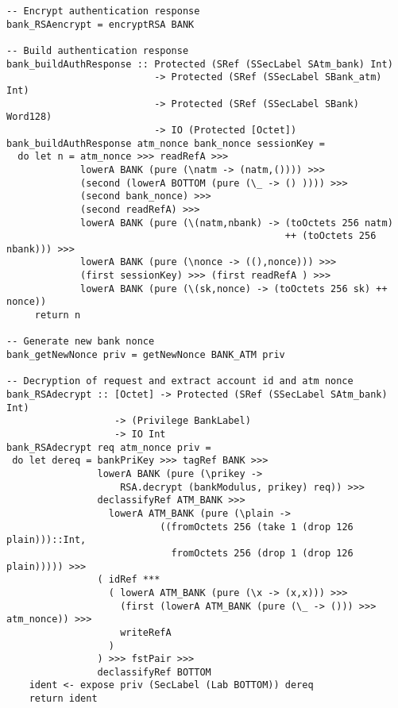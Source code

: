 \begin{Verbatim}[fontsize=\footnotesize,frame=lines,
                 framesep=5mm, label={[BankSystem.hs]BankSystem.hs}]
-- Encrypt authentication response
bank_RSAencrypt = encryptRSA BANK 

-- Build authentication response
bank_buildAuthResponse :: Protected (SRef (SSecLabel SAtm_bank) Int) 
                          -> Protected (SRef (SSecLabel SBank_atm) Int) 
                          -> Protected (SRef (SSecLabel SBank) Word128)
                          -> IO (Protected [Octet])
bank_buildAuthResponse atm_nonce bank_nonce sessionKey = 
  do let n = atm_nonce >>> readRefA >>> 
             lowerA BANK (pure (\natm -> (natm,()))) >>>
             (second (lowerA BOTTOM (pure (\_ -> () )))) >>>
             (second bank_nonce) >>> 
             (second readRefA) >>> 
	         lowerA BANK (pure (\(natm,nbank) -> (toOctets 256 natm) 
                                                 ++ (toOctets 256 nbank))) >>>
             lowerA BANK (pure (\nonce -> ((),nonce))) >>>
             (first sessionKey) >>> (first readRefA ) >>>
             lowerA BANK (pure (\(sk,nonce) -> (toOctets 256 sk) ++ nonce))
     return n

-- Generate new bank nonce
bank_getNewNonce priv = getNewNonce BANK_ATM priv
    
-- Decryption of request and extract account id and atm nonce
bank_RSAdecrypt :: [Octet] -> Protected (SRef (SSecLabel SAtm_bank) Int) 
                   -> (Privilege BankLabel)
                   -> IO Int
bank_RSAdecrypt req atm_nonce priv = 
 do let dereq = bankPriKey >>> tagRef BANK >>>
                lowerA BANK (pure (\prikey -> 
                    RSA.decrypt (bankModulus, prikey) req)) >>>
                declassifyRef ATM_BANK >>>
                  lowerA ATM_BANK (pure (\plain -> 
                           ((fromOctets 256 (take 1 (drop 126 plain)))::Int,
                             fromOctets 256 (drop 1 (drop 126 plain))))) >>>
                ( idRef *** 
                  ( lowerA ATM_BANK (pure (\x -> (x,x))) >>>
                    (first (lowerA ATM_BANK (pure (\_ -> ())) >>> atm_nonce)) >>> 
                    writeRefA
                  )
                ) >>> fstPair >>> 
                declassifyRef BOTTOM
    ident <- expose priv (SecLabel (Lab BOTTOM)) dereq
    return ident


\end{Verbatim}
